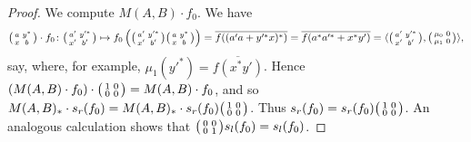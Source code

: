 \documentclass[a4paper,11pt]{article}
\theoremstyle{plain}
\theoremstyle{remark}
\newcommand{\ip}[2]{{\langle {#1} , {#2} \rangle}}
\newenvironment{smat}{\bigl(\begin{smallmatrix}}{\end{smallmatrix}\bigr)}
\begin{document}
\begin{proof}
We compute $M(A,B) \cdot f_0$.  We have
\begin{align*}
\begin{smat} a & y^* \\ x & b \end{smat} \cdot f_0 \colon 
\begin{smat} a' & y'^* \\ x' & b' \end{smat} \mapsto
  f_0\left( \begin{smat} a' & y'^* \\ x' & b' \end{smat}
  \begin{smat} a & y^* \\ x & b \end{smat} \right)
= \overline{ f( (a'a+y'^*x)^* ) }
= \overline{ f( a^*a'^* + x^*y' ) }
= \ip{\begin{smat} a' & y'^* \\ x' & b' \end{smat}}{\begin{smat} \mu_0 & 0 \\ \mu_1 & 0 \end{smat} },
\end{align*}
say, where, for example, $\mu_1(y'^*) = \overline{f(x^*y')}$.  Hence $(M(A,B)\cdot f_0) \cdot \begin{smat} 1 & 0 \\ 0 & 0 \end{smat} = M(A,B)\cdot f_0$, and so $M(A,B)_* \cdot s_r(f_0) = M(A,B)_* \cdot s_r(f_0) \begin{smat} 1 & 0 \\ 0 & 0 \end{smat}$.  Thus $s_r(f_0) = s_r(f_0) \begin{smat} 1 & 0 \\ 0 & 0 \end{smat}$.  An analogous calculation shows that $\begin{smat} 0 & 0 \\ 0 & 1 \end{smat} s_l(f_0) = s_l(f_0)$.


\end{proof}
\end{document}
